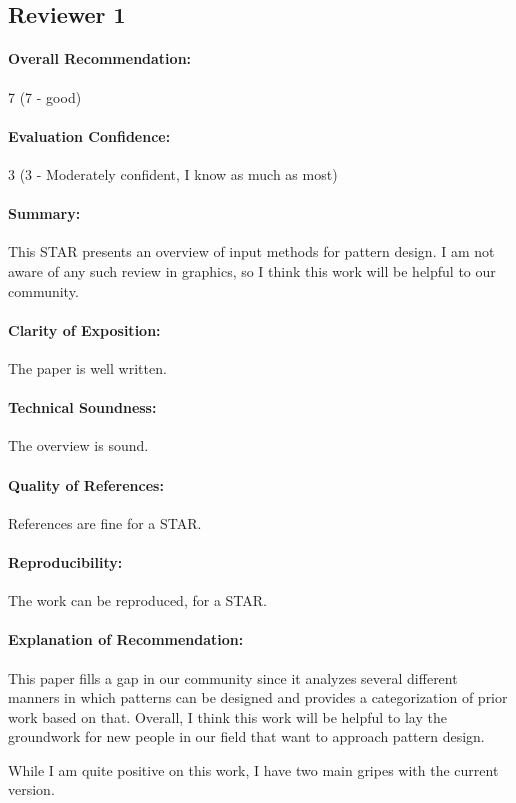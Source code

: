 \documentclass{egpubl}
\begin{document}
\subsection*{Reviewer 1} 

\paragraph*{Overall Recommendation:} 7 (7 - good)
\paragraph*{Evaluation Confidence:} 3 (3 - Moderately confident, I know as much as most)
\paragraph*{Summary:} This STAR presents an overview of input methods for pattern design. I am not aware of any such review in graphics, so I think this work will be helpful to our community.
\paragraph*{Clarity of Exposition:} The paper is well written.
\paragraph*{Technical Soundness:} The overview is sound.
\paragraph*{Quality of References:} References are fine for a STAR.
\paragraph*{Reproducibility:} The work can be reproduced, for a STAR.
\paragraph*{Explanation of Recommendation:} This paper fills a gap in our community since it analyzes several different manners in which patterns can be designed and provides a categorization of prior work based on that. Overall, I think this work will be helpful to lay the groundwork for new people in our field that want to approach pattern design.

While I am quite positive on this work, I have two main gripes with the current version.
\end{document}
